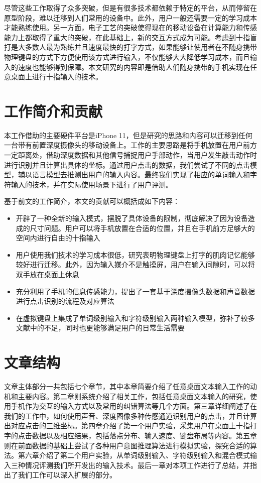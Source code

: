 尽管这些工作取得了众多突破，但是有很多技术都依赖于特定的平台，从而停留在原型阶段，难以迁移到人们常用的设备中。此外，用户一般还需要一定的学习成本才能熟练使用。另一方面，电子工艺的突破使得现在的移动设备在计算能力和传感能力上都取得了重大的突破，在此基础上，新的交互方式成为可能。考虑到十指盲打是大多数人最为熟练并且速度最快的打字方式，如果能够让使用者在不随身携带物理键盘的方式下方便使用该方式进行输入，不仅能够大大降低学习成本，而且输入的速度也能够得到保障。本文研究的内容即是借助人们随身携带的手机实现在任意桌面上进行十指输入的技术。

\section{工作简介和贡献}
本工作借助的主要硬件平台是iPhone 11，但是研究的思路和内容可以迁移到任何一台带有前置深度摄像头的移动设备上。工作的主要思路是将手机放置在用户前方一定距离处，借助深度数据和其他信号捕捉用户手部动作，当用户发生敲击动作时进行识别并且计算出具体的坐标。通过用户点击的数据，我们尝试了不同的点击模型，辅以语言模型去推测出用户的输入内容。最终我们实现了相应的单词输入和字符输入的技术，并在实际使用场景下进行了用户评测。

基于前文的工作简介，本文的贡献可以概括成如下内容：
\begin{itemize}
    \item 开辟了一种全新的输入模式，摆脱了具体设备的限制，彻底解决了因为设备造成的尺寸问题。用户可以将手机放置在合适的位置，并且在手机前方足够大的空间内进行自由的十指输入
    \item 用户使用我们技术的学习成本很低，研究表明物理键盘上打字的肌肉记忆能够较好进行迁移\cite{palmboard2020}\cite{2018shitoast}。此外，因为输入媒介不是触摸屏，用户在输入间隙时，可以将双手放在桌面上休息
    \item 充分利用了手机的信息传感能力，提出了一套基于深度摄像头数据和声音数据进行点击识别的流程及对应算法
    \item 在虚拟键盘上集成了单词级别输入和字符级别输入两种输入模型，弥补了较多文献中的不足，同时也更能够满足用户的日常生活需要
\end{itemize}

\section{文章结构}
文章主体部分一共包括七个章节，其中本章简要介绍了任意桌面文本输入工作的动机和主要内容。第二章则系统介绍了相关工作，包括任意桌面文本输入的研究，使用手机作为交互的输入方式以及常用的纠错算法等几个方面。第三章详细阐述了在我们的工作中，如何使用声音、深度图像多种传感通道识别用户的点击，并且计算出对应点击的三维坐标。第四章介绍了第一个用户实验，采集用户在桌面上十指打字的点击数据以及相应结果，包括落点分布、输入速度、键盘布局等内容。第五章则在前面数据的基础上尝试了各种用户意图推理算法进行模拟实验，探究合适的算法。第六章介绍了第二个用户实验，从单词级别输入、字符级别输入和混合模式输入三种情况评测我们所开发出的输入技术。最后一章对本项工作进行了总结，并指出了我们工作可以深入扩展的部分。